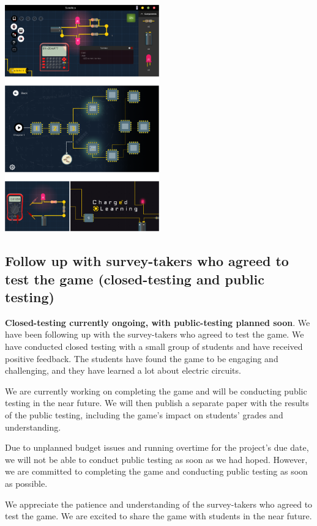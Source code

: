\documentclass[twoside,a4paper,11pt]{article}
\begin{document}
\begin{multicols}{2}
\begin{itemize}
\end{itemize}
\begin{center}
    \includegraphics[width=0.5\textwidth]{images/game_screenshots.png}
\end{center}


\subsection{Follow up with survey-takers who agreed to test the game (closed-testing and public testing)}
 \textbf{Closed-testing currently ongoing, with public-testing planned soon}. We have been following up with the survey-takers who agreed to test the game. We have conducted closed testing with a small group of students and have received positive feedback. The students have found the game to be engaging and challenging, and they have learned a lot about electric circuits.

 We are currently working on completing the game and will be conducting public testing in the near future. We will then publish a separate paper with the results of the public testing, including the game's impact on students' grades and understanding.
 
 Due to unplanned budget issues and running overtime for the project's due date, we will not be able to conduct public testing as soon as we had hoped. However, we are committed to completing the game and conducting public testing as soon as possible.
 
 We appreciate the patience and understanding of the survey-takers who agreed to test the game. We are excited to share the game with students in the near future.
 

\end{multicols}
\end{document}
